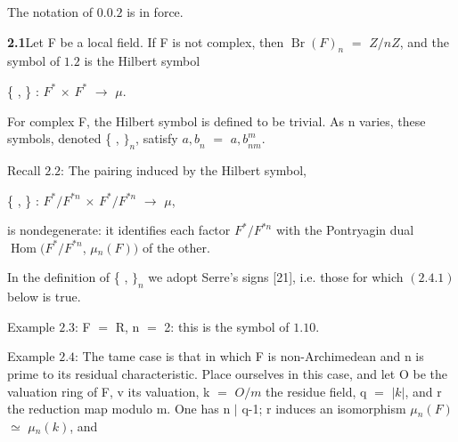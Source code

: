 \documentclass[10pt,a4paper]{article}
\begin{document}
\clearpage
{}
\label{d035-physical-014}
\par\medskip{}\par\smallskip
\par The notation of $0.0.2$ is in force.\par
\par\noindent\textbf{2.1}\quad Let F be a local field. If F is not complex, then $\operatorname{Br}(F)_n$ $=$ $Z/nZ$, and the symbol of $1.2$ is the Hilbert symbol\par
\par\smallskip\begin{center}\begin{minipage}{0.96\textwidth}\centering
\{ , \} : $F^*$ $\times{}$ $F^*$ $\to{}$ $\mu{}$.
\end{minipage}\end{center}\smallskip
\par For complex F, the Hilbert symbol is defined to be trivial. As n varies, these symbols, denoted \{ , $\}_n$, satisfy ${a,b}_n$ $=$ ${a,b}_{nm}^m$.\par
\par Recall $2.2$: The pairing induced by the Hilbert symbol,\par
\par\smallskip\begin{center}\begin{minipage}{0.96\textwidth}\centering
\{ , \} : $F^*/F^{*n}$ $\times{}$ $F^*/F^{*n}$ $\to{}$ $\mu{}$,
\end{minipage}\end{center}\smallskip
\par is nondegenerate: it identifies each factor $F^*/F^{*n}$ with the Pontryagin dual $\operatorname{Hom}(F^*/F^{*n}$, $\mu{}_n(F))$ of the other.\par
\par In the definition of \{ , $\}_n$ we adopt Serre's signs [21], i.e. those for which $(2.4.1)$ below is true.\par
\par Example $2.3$: F $=$ R, n $=$ 2: this is the symbol of $1.10$.\par
\par Example $2.4$: The tame case is that in which F is non-Archimedean and n is prime to its residual characteristic. Place ourselves in this case, and let O be the valuation ring of F, v its valuation, k $=$ $O/m$ the residue field, q $=$ $|k|$, and r the reduction map modulo m. One has n $|$ q-1; r induces an isomorphism $\mu{}_n(F)$ $\simeq{}$ $\mu{}_n(k)$, and\par
\end{document}
